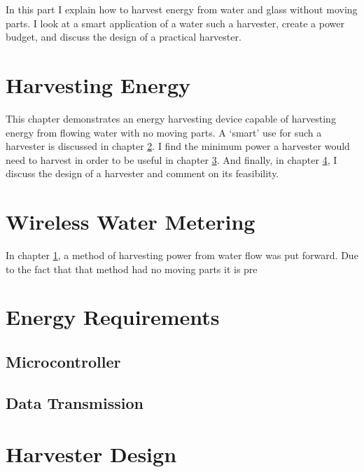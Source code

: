         In this part I explain how to harvest energy from water and glass without moving parts.
        I look at a smart application of a water such a harvester, create a power budget, and discuss the design of a practical harvester.


\chapter{Harvesting Energy}
    \label{chap:harvestingEnergy}

    This chapter demonstrates an energy harvesting device capable of harvesting energy from flowing water with no moving parts.
    A `smart' use for such a harvester is discussed in chapter \ref{chap:wirelessWaterMetering}.
    I find the minimum power a harvester would need to harvest in order to be useful in chapter \ref{chap:energyRequirements}.
    And finally, in chapter \ref{chap:harvesterDesign}, I discuss the design of a harvester and comment on its feasibility.

    

\chapter{Wireless Water Metering}
    \label{chap:wirelessWaterMetering}

    In chapter \ref{chap:harvestingEnergy}, a method of harvesting power from water flow was put forward.
    Due to the fact that that method had no moving parts it is pre

    

\chapter{Energy Requirements}
    \label{chap:energyRequirements}
    
    \section{Microcontroller}
        
    
    \section{Data Transmission}
        

\chapter{Harvester Design}
    \label{chap:harvesterDesign}
    

